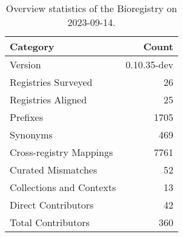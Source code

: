 \begin{table}
\caption{Overview statistics of the Bioregistry on 2023-09-14.}
\label{tab:bioregistry-summary}
\begin{tabular}{lr}
\toprule
Category & Count \\
\midrule
Version & 0.10.35-dev \\
Registries Surveyed & 26 \\
Registries Aligned & 25 \\
Prefixes & 1705 \\
Synonyms & 469 \\
Cross-registry Mappings & 7761 \\
Curated Mismatches & 52 \\
Collections and Contexts & 13 \\
Direct Contributors & 42 \\
Total Contributors & 360 \\
\bottomrule
\end{tabular}
\end{table}
